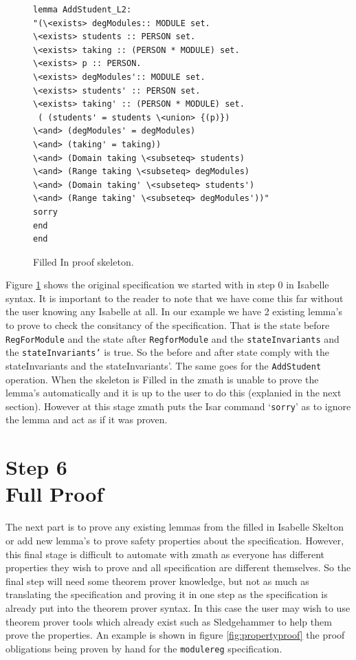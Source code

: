 \begin{figure}[H]
\begin{minipage}{0.45\textwidth}
\begin{scriptsize}
\begin{BVerbatim}
lemma AddStudent_L2:
"(\<exists> degModules:: MODULE set.
\<exists> students :: PERSON set.
\<exists> taking :: (PERSON * MODULE) set.
\<exists> p :: PERSON.
\<exists> degModules':: MODULE set.
\<exists> students' :: PERSON set.
\<exists> taking' :: (PERSON * MODULE) set.
 ( (students' = students \<union> {(p)}) 
\<and> (degModules' = degModules) 
\<and> (taking' = taking))
\<and> (Domain taking \<subseteq> students)
\<and> (Range taking \<subseteq> degModules)
\<and> (Domain taking' \<subseteq> students')
\<and> (Range taking' \<subseteq> degModules'))"
sorry
end
end
\end{BVerbatim}
\end{scriptsize}
\end{minipage}
\caption{Filled In proof skeleton. \label{fig:fillinFullexample}}
\end{figure}

Figure \ref{fig:fillinFullexample} shows the original specification we started with in step 0 in Isabelle syntax. It is important to the reader to note that we have come this far without the user knowing any Isabelle at all. In our example we have 2 existing lemma's to prove to check the consitancy of the specification. That is the state before \texttt{RegForModule} and the state after \texttt{RegforModule} and the \texttt{stateInvariants} and the \texttt{stateInvariants'} is true. So the before and after state comply with the stateInvariants and the stateInvariants'. The same goes for the \texttt{AddStudent} operation. When the skeleton is Filled in the \gls{zmath} is unable to prove the lemma's automatically and it is up to the user to do this (explanied in the next section). However at this stage \gls{zmath} puts the Isar command `\texttt{sorry}' as to ignore the lemma and act as if it was proven.

\section{Step 6\\Full Proof}

The next part is to prove any existing lemmas from the filled in Isabelle Skelton or add new lemma's to prove safety properties about the specification. However, this final stage is difficult to automate with \gls{zmath} as everyone has different properties they wish to prove and all specification are different themselves. So the final step will need some theorem prover knowledge, but not as much as translating the specification and proving it in one step as the specification is already put into the theorem prover syntax. In this case the user may wish to use theorem prover tools which already exist such as Sledgehammer \cite{sledgehammer} to help them prove the properties. An example is shown in figure \ref{fig:propertyproof} the proof obligations being proven by hand for the \texttt{modulereg} specification.


